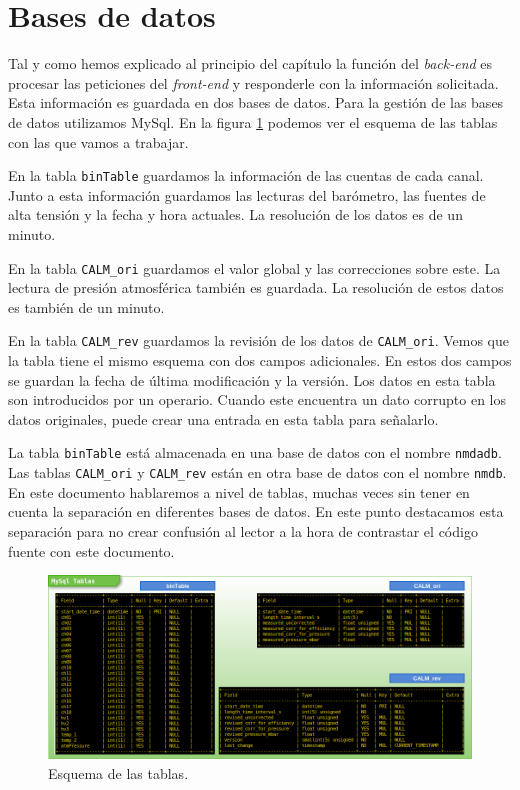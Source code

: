 \section{Bases de datos}
	Tal y como hemos explicado al principio del capítulo la función del \emph{back-end} es  procesar las peticiones del \emph{front-end} y
	responderle con la información solicitada. Esta información es guardada en dos bases de datos. Para la gestión de las bases de datos
	utilizamos MySql\cite{MySql}. En la figura \ref{fig:tablas} podemos ver el esquema de las tablas con las que vamos a trabajar.
	\par
	En la tabla \texttt{binTable} guardamos la información de las cuentas de cada canal. Junto a esta información guardamos las lecturas del
	barómetro, las fuentes de alta tensión y la fecha y hora actuales. La resolución de los datos es de un minuto.
	\par
	En la tabla \texttt{CALM\_ori} guardamos el valor global y las correcciones sobre este. La lectura de presión atmosférica también es guardada.
	La resolución de estos datos es también de un minuto.
	\par
	En la tabla \texttt{CALM\_rev} guardamos la revisión de los datos de \texttt{CALM\_ori}. Vemos que la tabla tiene el mismo esquema con dos
	campos adicionales. En estos dos campos se guardan la fecha de última modificación y la versión. Los datos en esta tabla son introducidos por
	un operario. Cuando este encuentra un dato corrupto en los datos originales, puede crear una entrada en esta tabla para señalarlo.
	\par
	La tabla \texttt{binTable} está almacenada en una base de datos con el nombre \texttt{nmdadb}. Las tablas \texttt{CALM\_ori} y
	\texttt{CALM\_rev} están en otra base de datos con el nombre \texttt{nmdb}. En este documento hablaremos a nivel de tablas, muchas veces sin
	tener en cuenta la separación en diferentes bases de datos. En este punto destacamos esta separación para no crear confusión al lector a la
	hora de contrastar el código fuente con este documento. 
	\begin{figure}[h]
		\centering
		\includegraphics[keepaspectratio, width=1\textwidth]{./img/tablas.png}
		\caption{Esquema de las tablas.}
		\label{fig:tablas}
	\end{figure}
